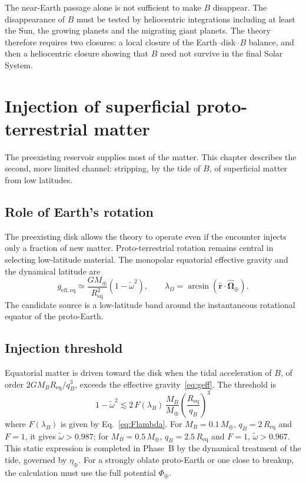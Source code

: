\documentclass[11pt,a4paper,openany]{report}
\newcommand{\Mt}{M_{\oplus}}
\newcommand{\Req}{R_{\mathrm{eq}}}
\begin{document}
\begin{controle}
The near-Earth passage alone is not sufficient to make $B$ disappear. The disappearance of $B$
must be tested by heliocentric integrations including at least the Sun, the growing planets and the
migrating giant planets. The theory therefore requires two closures: a local closure of the
Earth--disk--$B$ balance, and then a heliocentric closure showing that $B$ need not survive in the
final Solar System.
\end{controle}

\chapter{Injection of superficial proto-terrestrial matter}
\label{ch:injection}

The preexisting reservoir supplies most of the matter. This chapter describes the second, more
limited channel: stripping, by the tide of $B$, of superficial matter from low latitudes.

\section{Role of Earth's rotation}

The preexisting disk allows the theory to operate even if the encounter injects only a fraction of
new matter. Proto-terrestrial rotation remains central in selecting low-latitude material. The
monopolar equatorial effective gravity and the dynamical latitude are
\begin{equation}
g_{\mathrm{eff,eq}}\simeq\frac{G\Mt}{\Req^2}\left(1-\tilde\omega^2\right),
\qquad
\lambda_\Omega=\arcsin\!\left(\hat{\mathbf{r}}\cdot\hat{\boldsymbol{\Omega}}_\oplus\right).
\label{eq:geff}
\end{equation}
The candidate source is a low-latitude band around the instantaneous rotational equator of the
proto-Earth.

\section{Injection threshold}

Equatorial matter is driven toward the disk when the tidal acceleration of $B$, of order
$2GM_B\Req/q_B^3$, exceeds the effective gravity~\eqref{eq:geff}. The threshold is
\begin{equation}
\boxed{\;1-\tilde\omega^2\lesssim
2\,F(\lambda_B)\,\frac{M_B}{\Mt}\left(\frac{\Req}{q_B}\right)^3\;}
\label{eq:seuil}
\end{equation}
where $F(\lambda_B)$ is given by Eq.~\eqref{eq:Flambda}. For $M_B=0.1\,\Mt$,
$q_B=2\,\Req$ and $F=1$, it gives $\tilde\omega>0.987$; for $M_B=0.5\,\Mt$,
$q_B=2.5\,\Req$ and $F=1$, $\tilde\omega>0.967$. This static expression is completed in Phase~B by
the dynamical treatment of the tide, governed by $\eta_\oplus$. For a strongly oblate proto-Earth
or one close to breakup, the calculation must use the full potential $\Phi_\oplus$.
\end{document}
